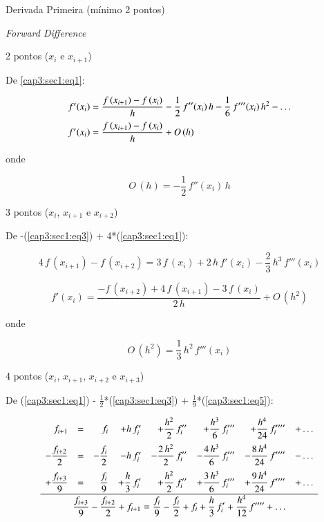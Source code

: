 \begin{enumerar}
 \item Derivada Primeira (mínimo 2 pontos)

\begin{enumerar}
 \item \textit{Forward Difference}

2 pontos ($x_{i}$ e $x_{i+1}$)

De \ref{cap3:sec1:eq1}:

\[
 \begin{array}{l}
  f'(x_i) = \displaystyle \frac{f\,(x_{i+1}) - f\,(x_i)}{h} - \frac{1}{2} \, f''(x_i) \, h - \frac{1}{6}\,f'''(x_i)\,h^2 - \ldots \vspace*{0.2cm} \\
  f'(x_i) = \displaystyle \frac{f\,(x_{i+1}) - f\,(x_i)}{h} + O\,(h)
 \end{array}
\]

onde

\[
 O\,(h) = -\frac{1}{2}\,f''(x_i)\,h
\]

3 pontos ($x_{i}$, $x_{i+1}$ e $x_{i+2}$)

De -(\ref{cap3:sec1:eq3}) + 4*(\ref{cap3:sec1:eq1}):

\[
 4\,f\,(x_{i+1}) - f\,(x_{i+2}) = 3\,f\,(x_i) + 2\,h\,f'(x_i) - \frac{2}{3}\,h^3\,f'''(x_i)
\]

\[
 f'(x_i) = \frac{-f\,(x_{i+2}) + 4\,f\,(x_{i+1}) - 3\,f\,(x_i)}{2\,h} + O\,(h^2)
\]

onde

\[
 O\,(h^2) = \frac{1}{3} \, h^2 \, f'''(x_i)
\]

4 pontos ($x_{i}$, $x_{i+1}$, $x_{i+2}$ e $x_{i+3}$)

De (\ref{cap3:sec1:eq1}) - $\displaystyle \frac{1}{2}$*(\ref{cap3:sec1:eq3}) + $\displaystyle \frac{1}{9}$*(\ref{cap3:sec1:eq5}):

\[
 \begin{array}{c}
 \underline{
 \begin{array}{rcrrrrrr}
    f_{i+1} & = & f_i & + h\,f'_i & + \displaystyle \frac{h^2}{2} \, f''_i & + \displaystyle \frac{h^3}{6} \, f'''_i & + \displaystyle \frac{h^4}{24} \, f''''_i & + \ldots \vspace*{0.2cm} \\
  - \displaystyle \frac{f_{i+2}}{2} & = & - \displaystyle \frac{f_i}{2} & - h\,f'_i & - \displaystyle \frac{2\,h^2}{2}\,f''_i & - \displaystyle \frac{4\,h^3}{6} \, f'''_i & - \displaystyle \frac{8\,h^4}{24}\,f'''' & - \ldots \vspace*{0.2cm} \\
  + \displaystyle \frac{f_{i+3}}{9} & = & \displaystyle \frac{f_i}{9} & + \displaystyle \frac{h}{3}\,f'_i & + \displaystyle \frac{h^2}{2}\,f''_i & + \displaystyle \frac{3\,h^3}{6}\,f'''_i & + \displaystyle \frac{9\,h^4}{24}\,f'''' & + \ldots
 \end{array}
 } \\
 \displaystyle \frac{f_{i+3}}{9} - \displaystyle \frac{f_{i+2}}{2} + f_{i+1} = \displaystyle \frac{f_i}{9} - \displaystyle \frac{f_i}{2} + f_i + \displaystyle \frac{h}{3}\,f'_i + \displaystyle \frac{h^4}{12}\,f'''' + \ldots
 \end{array}
\]


\end{enumerar}
\end{enumerar}
